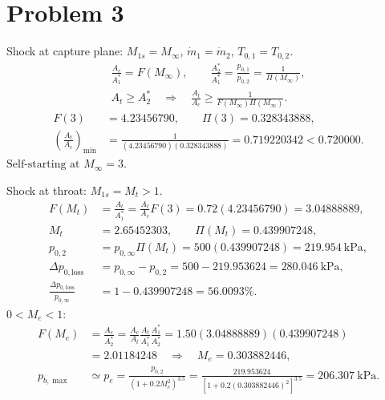 \section*{Problem 3}



Shock at capture plane: $M_{1s}=M_\infty$, $\dot m_1=\dot m_2$, $T_{0,1}=T_{0,2}$.
\begin{gather*}
\frac{A_c}{A_1^*}=F(M_\infty),\qquad
\frac{A_2^*}{A_1^*}=\frac{p_{0,1}}{p_{0,2}}=\frac{1}{\Pi(M_\infty)},\\
A_t\ge A_2^*
\quad\Longrightarrow\quad
\frac{A_t}{A_c}\ge\frac{1}{F(M_\infty)\Pi(M_\infty)}.
\end{gather*}
\begin{align*}
F(3)&=4.23456790,\qquad \Pi(3)=0.328343888,\\
\left(\frac{A_t}{A_c}\right)_{\min}
&=\frac{1}{(4.23456790)(0.328343888)}
=\boxed{0.719220342}<0.720000.
\end{align*}
$\boxed{\text{Self-starting at }M_\infty=3.}$

Shock at throat: $M_{1s}=M_t>1$.
\begin{align*}
F(M_t)&=\frac{A_t}{A_1^*}
=\frac{A_t}{A_c}F(3)=0.72(4.23456790)=3.04888889,\\
M_t&=2.65452303,\qquad \Pi(M_t)=0.439907248,\\
p_{0,2}&=p_{0,\infty}\Pi(M_t)
=500(0.439907248)=\boxed{219.954~\mathrm{kPa}},\\
\Delta p_{0,\mathrm{loss}}&=p_{0,\infty}-p_{0,2}
=500-219.953624=\boxed{280.046~\mathrm{kPa}},\\
\frac{\Delta p_{0,\mathrm{loss}}}{p_{0,\infty}}
&=1-0.439907248=\boxed{56.0093\%}.
\end{align*}
$0<M_e<1$:
\begin{align*}
F(M_e)&=\frac{A_e}{A_2^*}
=\frac{A_e}{A_t}\frac{A_t}{A_1^*}\frac{A_1^*}{A_2^*}
=1.50(3.04888889)(0.439907248)\\
&=2.01184248
\quad\Longrightarrow\quad M_e=0.303882446,\\
p_{b,\max}&\simeq p_e
=\frac{p_{0,2}}{(1+0.2M_e^2)^{3.5}}
=\frac{219.953624}{[1+0.2(0.303882446)^2]^{3.5}}
=\boxed{206.307~\mathrm{kPa}}.
\end{align*}

